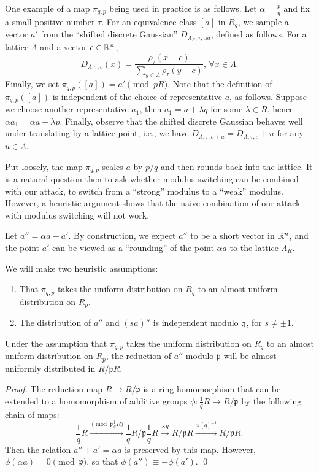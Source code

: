 \documentclass[envcountsame]{llncs}
\begin{document}
One example of a map $\pi_{q,p}$ being used in practice is as follows. Let $\alpha = \frac{p}{q}$ and fix a small positive number $\tau$. For an equivalence class $[a]$ in $R_q$, we sample a vector $a'$ from the ``shifted discrete Gaussian'' $D_{\Lambda_R, \tau, \alpha a}$,  defined as follows. For a lattice $\Lambda$ and a vector $c \in \mathbb{R}^n$,
\[
    D_{\Lambda, \tau, c}(x) = \frac{\rho_\tau(x - c)}{\sum_{y \in\Lambda} \rho_\tau(y-c)}, \, \forall x \in \Lambda.
\]
Finally, we set $ \pi_{q,p}([a]) = a' \pmod{pR}$. Note that the definition of $\pi_{q,p}([a])$ is independent of the choice of  representative $a$, as follows.  Suppose we choose another representative $a_1$, then $a_1 = a+ \lambda q$ for some $\lambda \in R$, hence $\alpha a_1 = \alpha a + \lambda p$.  Finally, observe that the shifted discrete Gaussian behaves well under translating by a lattice point, i.e., we have $D_{\Lambda, \tau, c+u} = D_{\Lambda, \tau, c} + u$ for any $u \in \Lambda$.  

Put loosely, the map $\pi_{q,p}$ scales $a$ by $p/q$ and then rounds back into the lattice.  It is a natural question then to ask whether modulus switching can be combined with our attack, to switch from a ``strong'' modulus to a ``weak'' modulus.  However, a heuristic argument shows that the naive combination of our attack with modulus switching will not work.  

Let $a'' = \alpha a - a'$. By construction, we expect $a''$ to be a  short vector in $\mathbb{R}^n$, and the point $a'$ can be viewed as a ``rounding'' of the point $\alpha a$ to the lattice $\Lambda_R$. 

We will make two heuristic assumptions:

\begin{enumerate}
        \item That $\pi_{q,p}$ takes the uniform distribution on $R_q$ to an almost uniform distribution on $R_p$.
        \item The distribution of $a''$ and $(sa)''$ is independent modulo $\mathfrak{q}$, for $s \neq \pm 1$. 
\end{enumerate}

\begin{proposition}
        Under the assumption that $\pi_{q,p}$ takes the uniform distribution on $R_q$ to an almost uniform distribution on $R_p$, the reduction of $a''$ modulo $\mathfrak{p}$ will be almost uniformly distributed in $R/\mathfrak{p}R$.
\end{proposition}

\begin{proof}
The reduction map $R \rightarrow R/\mathfrak{p}$ 
is a ring homomorphism that can be extended to a homomorphism of additive groups $\phi: \frac{1}{q} R \rightarrow R/\mathfrak{p}$ by the following chain of maps:
\[
        \frac{1}{q} R \xrightarrow{\pmod{\mathfrak{p}\frac{1}{q}R}} \frac{1}{q}R \Big/ \mathfrak{p}\frac{1}{q}R \xrightarrow{ \times q} R/\mathfrak{p}R \xrightarrow{ \times [q]^{-1}} R/\mathfrak{p}R.
\]
Then the relation $a'' + a' = \alpha a$ is preserved by this map.  However, $\phi(\alpha a) = 0 \pmod{\mathfrak{p}}$, so that $\phi(a'') \equiv -\phi(a')$. \qed
\end{proof}
\end{document}
